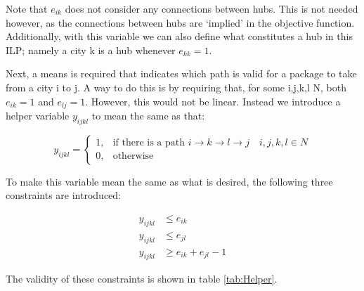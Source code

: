 \documentclass{article}
\begin{document}
Note that $e_{ik}$ does not consider any connections between hubs. This is not needed however, as the connections between hubs are `implied' in the objective function. Additionally, with this variable we can also define what constitutes a hub in this ILP; namely a city k is a hub whenever $e_{kk} = 1$.

Next, a means is required that indicates which path is valid for a package to take from a city i to j. A way to do this is by requiring that, for some i,j,k,l \in N, both $e_{ik} = 1$ and $e_{lj} = 1$. However, this would not be linear. Instead we introduce a helper variable $y_{ijkl}$ to mean the same as that:

$$
y_{ijkl} =
\begin{cases} 
1, & \text{if there is a path } i \rightarrow k \rightarrow l \rightarrow j \quad i,j,k,l \in N \\ 
0, & \text{otherwise} 
\end{cases}
$$
    
To make this variable mean the same as what is desired, the following three constraints are introduced:
    
\begin{align*}
    y_{ijkl} &\leq e_{ik} \\
    y_{ijkl} &\leq e_{jl} \\
    y_{ijkl} &\geq e_{ik} + e_{jl} - 1
\end{align*}
    
The validity of these constraints is shown in table \ref{tab:Helper}.
\end{document}
